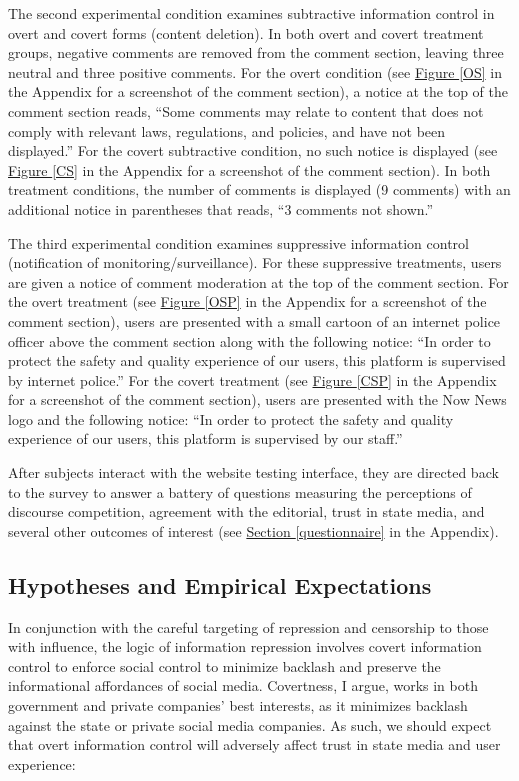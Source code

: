 \documentclass[11pt]{article}
\begin{document}
The second experimental condition examines subtractive information control in overt and covert forms (content deletion). In both overt and covert treatment groups, negative comments are removed from the comment section, leaving three neutral and three positive comments. For the overt condition (see \hyperref[OS]{Figure \ref*{OS}} in the Appendix for a screenshot of the comment section), a notice at the top of the comment section reads, ``Some comments may relate to content that does not comply with relevant laws, regulations, and policies, and have not been displayed.'' For the covert subtractive condition, no such notice is displayed (see \hyperref[CS]{Figure \ref*{CS}} in the Appendix for a screenshot of the comment section). In both treatment conditions, the number of comments is displayed (9 comments) with an additional notice in parentheses that reads, ``3 comments not shown.''

The third  experimental condition examines suppressive information control (notification of monitoring/surveillance). For these suppressive treatments, users are given a notice of comment moderation at the top of the comment section. For the overt treatment (see \hyperref[OSP]{Figure \ref*{OSP}} in the Appendix for a screenshot of the comment section), users are presented with a small cartoon of an internet police officer above the comment section along with the following notice: ``In order to protect the safety and quality experience of our users, this platform is supervised by internet police.'' For the covert treatment (see \hyperref[CSP]{Figure \ref*{CSP}} in the Appendix for a screenshot of the comment section), users are presented with the Now News logo and the following notice: ``In order to protect the safety and quality experience of our users, this platform is supervised by our staff.''

After subjects interact with the website testing interface, they are directed back to the survey to answer a battery of questions measuring the perceptions of discourse competition, agreement with the editorial, trust in state media, and several other outcomes of interest (see \hyperref[questionnaire]{Section \ref*{questionnaire}} in the Appendix).

\subsection{Hypotheses and Empirical Expectations}

In conjunction with the careful targeting of repression and censorship to those with influence, the logic of information repression involves covert information control to enforce social control to minimize backlash and preserve the informational affordances of social media. Covertness, I argue, works in both government and private companies' best interests, as it minimizes backlash against the state or private social media companies. As such, we should expect that overt information control will adversely affect trust in state media and user experience:
\end{document}
